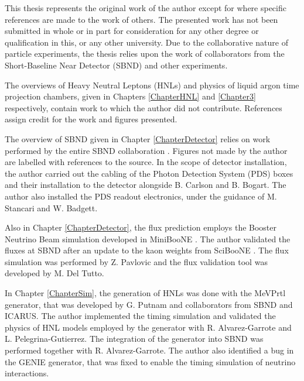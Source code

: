 
\begin{declaration}

This thesis represents the original work of the author except for where specific references are made to the work of others.
The presented work has not been submitted in whole or in part for consideration for any other degree or qualification in this, or any other university. 
Due to the collaborative nature of particle experiments, the thesis relies upon the work of collaborators from the Short-Baseline Near Detector (SBND) and other experiments.

The overviews of Heavy Neutral Leptons (HNLs) and physics of liquid argon time projection chambers, given in Chapters \ref{ChapterHNL} and \ref{Chapter3} respectively, contain work to which the author did not contribute.
References assign credit for the work and figures presented.

The overview of SBND given in Chapter \ref{ChapterDetector} relies on work performed by the entire SBND collaboration \cite{SBNProgram,sbnd_det}.
Figures not made by the author are labelled with references to the source.
In the scope of detector installation, the author carried out the cabling of the Photon Detection System (PDS) boxes and their installation to the detector alongside B. Carlson and B. Bogart.
The author also installed the PDS readout electronics, under the guidance of M. Stancari and W. Badgett.

Also in Chapter \ref{ChapterDetector}, the flux prediction employs the Booster Neutrino Beam simulation developed in MiniBooNE \cite{BNBFlux}.
The author validated the fluxes at SBND after an update to the kaon weights from SciBooNE \cite{SciBooNE}.
The flux simulation was performed by Z. Pavlovic and the flux validation tool was developed by M. Del Tutto. 

In Chapter \ref{ChapterSim}, the generation of HNLs was done with the MeVPrtl generator, that was developed by G. Putnam and collaborators from SBND and ICARUS.
The author implemented the timing simulation and validated the physics of HNL models employed by the generator with R. Alvarez-Garrote and L. Pelegrina-Gutierrez.
The integration of the generator into SBND was performed together with R. Alvarez-Garrote.
The author also identified a bug in the GENIE generator, that was fixed to enable the timing simulation of neutrino interactions.


\end{declaration}
